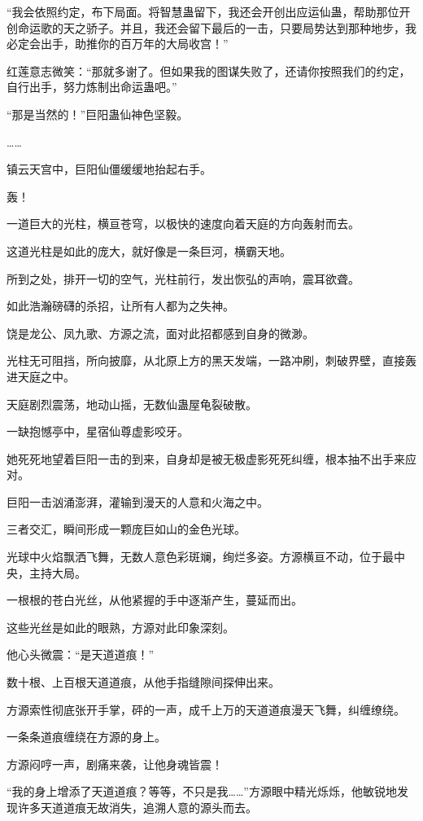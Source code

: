 \begin{this_body}
“我会依照约定，布下局面。将智慧蛊留下，我还会开创出应运仙蛊，帮助那位开创命运歌的天之骄子。并且，我还会留下最后的一击，只要局势达到那种地步，我必定会出手，助推你的百万年的大局收宫！”

红莲意志微笑：“那就多谢了。但如果我的图谋失败了，还请你按照我们的约定，自行出手，努力炼制出命运蛊吧。”

“那是当然的！”巨阳蛊仙神色坚毅。

……

镇云天宫中，巨阳仙僵缓缓地抬起右手。

轰！

一道巨大的光柱，横亘苍穹，以极快的速度向着天庭的方向轰射而去。

这道光柱是如此的庞大，就好像是一条巨河，横霸天地。

所到之处，排开一切的空气，光柱前行，发出恢弘的声响，震耳欲聋。

如此浩瀚磅礴的杀招，让所有人都为之失神。

饶是龙公、凤九歌、方源之流，面对此招都感到自身的微渺。

光柱无可阻挡，所向披靡，从北原上方的黑天发端，一路冲刷，刺破界壁，直接轰进天庭之中。

天庭剧烈震荡，地动山摇，无数仙蛊屋龟裂破散。

一缺抱憾亭中，星宿仙尊虚影咬牙。

她死死地望着巨阳一击的到来，自身却是被无极虚影死死纠缠，根本抽不出手来应对。

巨阳一击汹涌澎湃，灌输到漫天的人意和火海之中。

三者交汇，瞬间形成一颗庞巨如山的金色光球。

光球中火焰飘洒飞舞，无数人意色彩斑斓，绚烂多姿。方源横亘不动，位于最中央，主持大局。

一根根的苍白光丝，从他紧握的手中逐渐产生，蔓延而出。

这些光丝是如此的眼熟，方源对此印象深刻。

他心头微震：“是天道道痕！”

数十根、上百根天道道痕，从他手指缝隙间探伸出来。

方源索性彻底张开手掌，砰的一声，成千上万的天道道痕漫天飞舞，纠缠缭绕。

一条条道痕缠绕在方源的身上。

方源闷哼一声，剧痛来袭，让他身魂皆震！

“我的身上增添了天道道痕？等等，不只是我……”方源眼中精光烁烁，他敏锐地发现许多天道道痕无故消失，追溯人意的源头而去。


\end{this_body}
